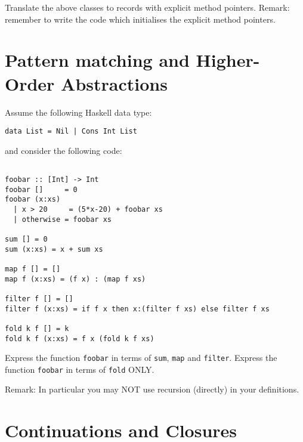 \documentclass{article}
\newcommand{\answer}[1]{}
\begin{document}
Translate the above classes to records with explicit method pointers.
Remark: remember to write the code which initialises the explicit
method pointers. 

\answer{
\begin{verbatim}
    struct A {
      float x = 0
      float y = 0
    }
    struct B {
      int n = 0
      void* f(B* this, A* p) = <BODY1>;
    }
    struct C {
      int n = 0
      void* f(C* this, A* p) = <BODY2>;
      int m;
    }
\end{verbatim}
}

\newpage
\section{Pattern matching and Higher-Order Abstractions}

Assume the following Haskell data type:
\begin{verbatim}
data List = Nil | Cons Int List
\end{verbatim}
and consider the following code:
\begin{verbatim}

foobar :: [Int] -> Int
foobar []     = 0
foobar (x:xs)
  | x > 20     = (5*x-20) + foobar xs
  | otherwise = foobar xs

sum [] = 0
sum (x:xs) = x + sum xs

map f [] = []
map f (x:xs) = (f x) : (map f xs)

filter f [] = []
filter f (x:xs) = if f x then x:(filter f xs) else filter f xs

fold k f [] = k
fold k f (x:xs) = f x (fold k f xs)
\end{verbatim}

Express the function \texttt{foobar} in terms of \texttt{sum}, \texttt{map} and \texttt{filter}.
Express the function \texttt{foobar} in terms of \texttt{fold} ONLY.

Remark: In particular you may NOT use recursion (directly) in your definitions.

\answer{
  \begin{verbatim}
  foobar = sum . map (\x -> 7*x+2) . filter (>3)
  foobar = fold 0 f where
     f x acc = if x > 3 then 7*x + 2 + acc else acc
   \end{verbatim}
}
\newpage
\section{Continuations and Closures}
\end{document}
